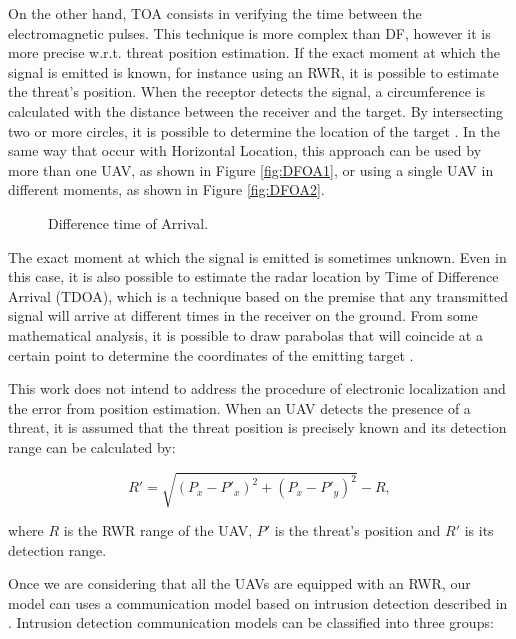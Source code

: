 On the other hand, TOA consists in verifying the time between the electromagnetic pulses. This technique is more complex than DF, however it is more precise w.r.t. threat position estimation. If the exact moment at which the signal is emitted is known, for instance using an RWR, it is possible to estimate the threat's position. When the receptor detects the signal, a circumference is calculated with the distance between the receiver and the target. By intersecting two or more circles, it is possible to determine the location of the target \cite{exercito_2009}. In the same way that occur with Horizontal Location, this approach can be used by more than one UAV, as shown in Figure \ref{fig:DFOA1}, or using a single UAV in different moments, as shown in Figure \ref{fig:DFOA2}.

   \begin{figure}[h!]
      \centering
      \caption{Difference time of Arrival.}      
    \end{figure}

The exact moment at which the signal is emitted is sometimes unknown. Even in this case, it is also possible to estimate the radar location by Time of Difference Arrival (TDOA), which  is a technique based on the premise that any transmitted signal will arrive at different times in the receiver on the ground. From some mathematical analysis, it is possible to draw parabolas that will coincide at a certain point to determine the coordinates of the emitting target \cite{exercito_2009}.

This work does not intend to address the procedure of electronic localization and the error from position estimation. When an UAV detects the presence of a threat, it is assumed that the threat position is precisely known and its detection range can be calculated by:

\begin{equation}
R' = \sqrt{(P_x - P'_x)^2 + (P_x - P'_y)^2} - R,
\label{eq:threatRange}
\end{equation}

where $R$ is the RWR range of the UAV, $P'$ is the threat's position and $R'$ is its detection range.

Once we are considering that all the UAVs are equipped with an RWR, our model can uses a communication model based on intrusion detection described in \cite{farhan_2010}. Intrusion detection communication models can be classified into three groups:

